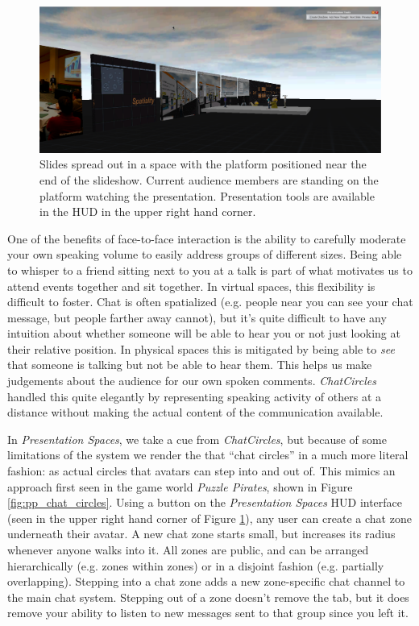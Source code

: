 \begin{figure}[t]
	\includegraphics{figures/presentation_screenshot.png}
	\caption{Slides spread out in a space with the platform positioned near the end of the slideshow. Current audience members are standing on the platform watching the presentation. Presentation tools are available in the HUD in the upper right hand corner.}
	\label{fig:presentation_overview}
\end{figure}

One of the benefits of face-to-face interaction is the ability to carefully moderate your own speaking volume to easily address groups of different sizes. Being able to whisper to a friend sitting next to you at a talk is part of what motivates us to attend events together and sit together. In virtual spaces, this flexibility is difficult to foster. Chat is often spatialized (e.g. people near you can see your chat message, but people farther away cannot), but it's quite difficult to have any intuition about whether someone will be able to hear you or not just looking at their relative position. In physical spaces this is mitigated by being able to \emph{see} that someone is talking but not be able to hear them. This helps us make judgements about the audience for our own spoken comments. \emph{ChatCircles} handled this quite elegantly by representing speaking activity of others at a distance without making the actual content of the communication available. \citep{Viegas:1999kv}

In \emph{Presentation Spaces}, we take a cue from \emph{ChatCircles}, but because of some limitations of the system we render the that ``chat circles'' in a much more literal fashion: as actual circles that avatars can step into and out of. This mimics an approach first seen in the game world \emph{Puzzle Pirates}, shown in Figure \ref{fig:pp_chat_circles}. Using a button on the \emph{Presentation Spaces} HUD interface (seen in the upper right hand corner of Figure \ref{fig:presentation_overview}), any user can create a chat zone underneath their avatar. A new chat zone starts small, but increases its radius whenever anyone walks into it. All zones are public, and can be arranged hierarchically (e.g. zones within zones) or in a disjoint fashion (e.g. partially overlapping). Stepping into a chat zone adds a new zone-specific chat channel to the main chat system. Stepping out of a zone doesn't remove the tab, but it does remove your ability to listen to new messages sent to that group since you left it.

